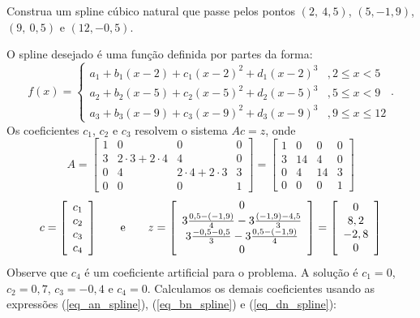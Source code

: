 \documentclass[main.tex]{subfiles}
\begin{document}
\begin{ex}Construa um spline cúbico natural que passe pelos pontos $(2,~4,5)$, $(5,-1,9)$, $(9,~0,5)$ e $(12,-0,5)$.
\end{ex}
\begin{sol}
O spline desejado é uma função definida por partes da forma:
\begin{equation}
f(x)=\left\{\begin{array}{ll}
a_1+b_1(x-2)+c_1(x-2)^2+d_1(x-2)^3 &, 2\leq x <5\\
a_2+b_2(x-5)+c_2(x-5)^2+d_2(x-5)^3 &, 5\leq x <9\\
a_3+b_3(x-9)+c_3(x-9)^2+d_3(x-9)^3 &, 9\leq x \leq 12
\end{array}\right..  
\end{equation}
Os coeficientes $c_1$, $c_2$ e $c_3$ resolvem o sistema $Ac = z$, onde
$$
A=\left[\begin{array}{cccc}
1 &0&0&0 \\
3&2\cdot 3+2\cdot 4&4&0\\
0&4&2\cdot 4+2\cdot 3&3\\
0&0&0&1
\end{array}\right]=\left[\begin{array}{cccc}
1 &0&0&0 \\
3&14&4&0\\
0&4&14&3\\
0&0&0&1
\end{array}\right]
$$
$$
c = \left[\begin{array}{c}
c_1\\
c_2\\
c_3\\
c_4
\end{array}\right]\qquad \hbox{e}\qquad
z=\left[\begin{array}{c}
0\\
3\frac{0,5-(-1,9)}{4}-3\frac{(-1,9)-4,5}{3}\\
3\frac{-0,5-0,5}{3}-3\frac{0,5-(-1,9)}{4}\\
0
\end{array}\right]=\left[\begin{array}{c}
0\\
8,2\\
-2,8\\
0
\end{array}\right]
$$
Observe que $c_4$ é um coeficiente artificial para o problema. A solução é  $c_1=0$, $c_2=0,7$, $c_3=-0,4$ e $c_4=0$. Calculamos os demais coeficientes usando as expressões (\ref{eq_an_spline}), (\ref{eq_bn_spline}) e (\ref{eq_dn_spline}):

\end{sol}
\end{document}
